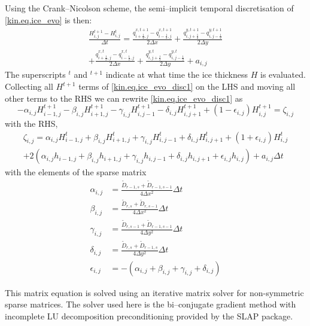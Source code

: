 Using the Crank--Nicolson scheme, the semi--implicit temporal discretisation of \eqref{kin.eq.ice_evo} is then:
\begin{multline}
\label{kin.eq.ice_evo_disc1}
  \frac{H^{t+1}_{i,j}-H^t_{i,j}}{\Delta t}=\frac{q^{x,t+1}_{i+\frac12,j}-q^{x,t+1}_{i-\frac12,j}}{2\Delta x}+\frac{q^{y,t+1}_{i,j+\frac12}-q^{y,t+1}_{i,j-\frac12}}{2\Delta y} \\
  +\frac{q^{x,t}_{i+\frac12,j}-q^{x,t}_{i-\frac12,j}}{2\Delta x}+\frac{q^{y,t}_{i,j+\frac12}-q^{y,t}_{i,j-\frac12}}{2\Delta y}+ a_{i,j}
\end{multline}
The superscripts $^t$ and $^{t+1}$ indicate at what time the ice thickness $H$ is evaluated. Collecting all $H^{t+1}$ terms of \eqref{kin.eq.ice_evo_disc1} on the LHS and moving all other terms to the RHS we can rewrite \eqref{kin.eq.ice_evo_disc1} as
\begin{equation}
  \label{kin.eq.evo_matrix}
  -\alpha_{i,j}H^{t+1}_{i-1,j} - \beta_{i,j}H^{t+1}_{i+1,j} - \gamma_{i,j}H^{t+1}_{i,j-1} - \delta_{i,j}H^{t+1}_{i,j+1}+ (1-\epsilon_{i,j})H^{t+1}_{i,j} = \zeta_{i,j}
\end{equation}
with the RHS,
\begin{multline}
  \zeta_{i,j} = \alpha_{i,j}H^{t}_{i-1,j} + \beta_{i,j}H^{t}_{i+1,j} + \gamma_{i,j}H^{t}_{i,j-1} + \delta_{i,j}H^{t}_{i,j+1} + (1+\epsilon_{i,j})H^{t}_{i,j} \\
  + 2(\alpha_{i,j}h_{i-1,j} + \beta_{i,j}h_{i+1,j} + \gamma_{i,j}h_{i,j-1} + \delta_{i,j}h_{i,j+1}+ \epsilon_{i,j}h_{i,j}) + a_{i,j}\Delta t
\end{multline}
with the elements of the sparse matrix
\begin{subequations}
  \begin{align}
    \alpha_{i,j} &=\frac{\tilde{D}_{r-1,s}+\tilde{D}_{r-1,s-1}}{4\Delta x^2}\Delta t\\
    \beta_{i,j} &=\frac{\tilde{D}_{r,s}+\tilde{D}_{r,s-1}}{4\Delta x^2}\Delta t\\
    \gamma_{i,j} &=\frac{\tilde{D}_{r,s-1}+\tilde{D}_{r-1,s-1}}{4\Delta y^2}\Delta t\\
    \delta_{i,j} &=\frac{\tilde{D}_{r,s}+\tilde{D}_{r-1,s}}{4\Delta y^2}\Delta t\\
    \epsilon_{i,j} &=-(\alpha_{i,j}+\beta_{i,j}+\gamma_{i,j}+\delta_{i,j})
  \end{align}
\end{subequations}

This matrix equation is solved using an iterative matrix solver for non-symmetric sparse matrices. The solver used here is the bi--conjugate gradient method with incomplete LU decomposition preconditioning provided by the SLAP package.

